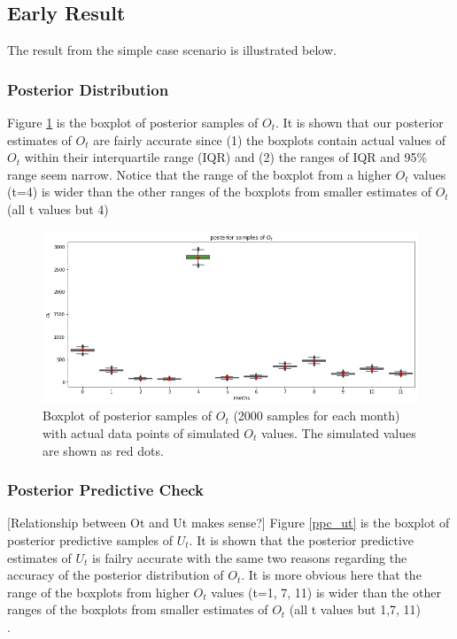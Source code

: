 \documentclass[]{article}
\begin{document}
\subsection{Early Result } 

The result from the simple case scenario is illustrated below.

\subsubsection{Posterior Distribution}


Figure \ref{pst_ot} is the boxplot of posterior samples of $O_t$. It is shown that our posterior estimates of  $O_t$ are fairly accurate since (1) the boxplots contain actual values of $O_t$ within their interquartile range (IQR) and (2) the ranges of IQR and 95\% range seem narrow. Notice that the range of the boxplot from a higher $O_t$ values (t=4) is wider than the other ranges of the boxplots from smaller estimates of $O_t$ (all t values but 4)\\

\begin{figure}[h]
	\centering
	\includegraphics[width=1\linewidth]{Figures/earlyresult1_ot.png}
	\caption{Boxplot of posterior samples of $O_t$ (2000 samples for each month) with actual data points of simulated $O_t$ values. The simulated values are shown as red dots.}
	\label{pst_ot}
\end{figure}

\newpage
\subsubsection{Posterior Predictive Check}

[Relationship between Ot and Ut makes sense?]
Figure \ref{ppc_ut} is the boxplot of posterior predictive samples of $U_t$. It is shown that the posterior predictive estimates of $U_t$ is failry accurate with the same two reasons regarding the accuracy of the posterior distribution of $O_t$. It is more obvious here that the range of the boxplots from  higher $O_t$ values (t=1, 7, 11) is wider than the other ranges of the boxplots from smaller estimates of $O_t$ (all t values but 1,7, 11)\\.
\end{document}
